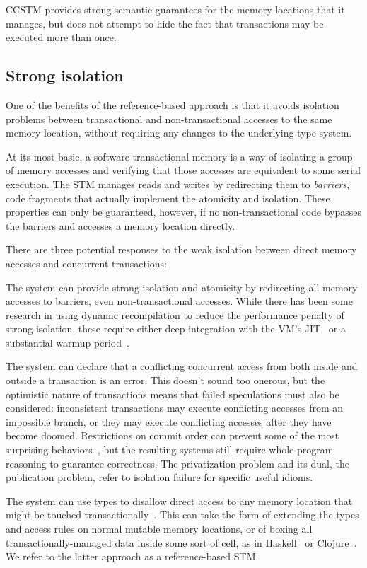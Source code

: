 
CCSTM provides strong semantic guarantees for the memory locations that it
manages, but does not attempt to hide the fact that transactions may be
executed more than once.

\subsection{Strong isolation}

One of the benefits of the reference-based approach is that it avoids
isolation problems between transactional and non-transactional accesses to
the same memory location, without requiring any changes to the underlying
type system.

At its most basic, a software transactional memory is a way of isolating
a group of memory accesses and verifying that those accesses are
equivalent to some serial execution.  The STM manages reads and writes
by redirecting them to \textit{barriers}, code fragments that actually
implement the atomicity and isolation.  These properties can only be
guaranteed, however, if no non-transactional code bypasses the barriers
and accesses a memory location directly.

There are three potential responses to the weak isolation between direct memory
accesses and concurrent transactions:
\begin{packed_itemize}

\item The system can provide strong isolation and atomicity by redirecting
all memory accesses to barriers, even non-transactional accesses.
While there has been some research in using dynamic recompilation
to reduce the performance penalty of strong isolation, these require
either deep integration with the VM's JIT~\cite{schneider08dynamic}
or a substantial warmup period~\cite{bronson09dbo}.

\item The system can declare that a conflicting concurrent access
from both inside and outside a transaction is an error.  This doesn't
sound too onerous, but the optimistic nature of transactions means that
failed speculations must also be considered: inconsistent transactions
may execute conflicting accesses from an impossible branch, or they
may execute conflicting accesses after they have become doomed.
Restrictions on commit order can prevent some of the most surprising
behaviors~\cite{sgla08}, but the resulting systems still require
whole-program reasoning to guarantee correctness.  The privatization
problem and its dual, the publication problem, refer to isolation failure
for specific useful idioms.

\item The system can use types to disallow direct access to any memory
location that might be touched transactionally~\cite{moore08semantics}.
This can take the form of extending the types and access rules on normal
mutable memory locations, or of boxing all transactionally-managed
data inside some sort of cell, as in Haskell~\cite{harris05composable}
or Clojure~\cite{hickey08clojure}.  We refer to the latter approach as
a reference-based STM.

\end{packed_itemize}

